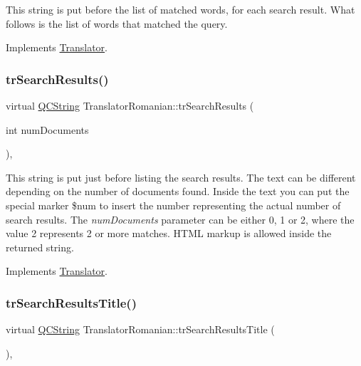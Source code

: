 This string is put before the list of matched words, for each search result. What follows is the list of words that matched the query. 

Implements \mbox{\hyperlink{class_translator}{Translator}}.

\mbox{\label{class_translator_romanian_a36e2957bbfc76fc554856dbe067dcae7}} 
\subsubsection{\texorpdfstring{trSearchResults()}{trSearchResults()}}
{\footnotesize\ttfamily virtual \mbox{\hyperlink{class_q_c_string}{Q\+C\+String}} Translator\+Romanian\+::tr\+Search\+Results (\begin{DoxyParamCaption}\item[{int}]{num\+Documents }\end{DoxyParamCaption})\hspace{0.3cm}{\ttfamily [inline]}, {\ttfamily [virtual]}}

This string is put just before listing the search results. The text can be different depending on the number of documents found. Inside the text you can put the special marker \$num to insert the number representing the actual number of search results. The {\itshape num\+Documents} parameter can be either 0, 1 or 2, where the value 2 represents 2 or more matches. H\+T\+ML markup is allowed inside the returned string. 

Implements \mbox{\hyperlink{class_translator}{Translator}}.

\mbox{\label{class_translator_romanian_a948f639d77578d00b6288056b68defd8}} 
\subsubsection{\texorpdfstring{trSearchResultsTitle()}{trSearchResultsTitle()}}
{\footnotesize\ttfamily virtual \mbox{\hyperlink{class_q_c_string}{Q\+C\+String}} Translator\+Romanian\+::tr\+Search\+Results\+Title (\begin{DoxyParamCaption}{ }\end{DoxyParamCaption})\hspace{0.3cm}{\ttfamily [inline]}, {\ttfamily [virtual]}}


